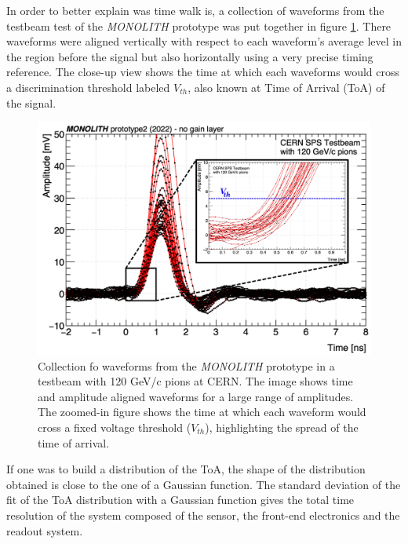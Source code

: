 	In order to better explain was time walk is, a collection of waveforms from the testbeam test of the \textit{MONOLITH} prototype was put together in figure \ref{im:waveforms_timeresolution}. There waveforms were aligned vertically with respect to each waveform's average level in the region before the signal but also horizontally using a very precise timing reference. The close-up view shows the time at which each waveforms would cross a discrimination threshold labeled $V_{th}$, also known at Time of Arrival (ToA) of the signal.
	\begin{figure}[h]
		\centering
		\includegraphics[width=0.85\linewidth]{files/waveforms_timeresolution}
		\caption{Collection fo waveforms from the \textit{MONOLITH} prototype in a testbeam with 120 GeV/c pions at CERN. The image shows time and amplitude aligned waveforms for a large range of amplitudes. The zoomed-in figure shows the time at which each waveform would cross a fixed voltage threshold ($V_{th}$), highlighting the spread of the time of arrival.}
		\label{im:waveforms_timeresolution}
	\end{figure} 
	
	If one was to build a distribution of the ToA, the shape of the distribution obtained is close to the one of a Gaussian function. The standard deviation of the fit of the ToA distribution with a Gaussian function gives the total time resolution of the system composed of the sensor, the front-end electronics and the readout system. 
	
